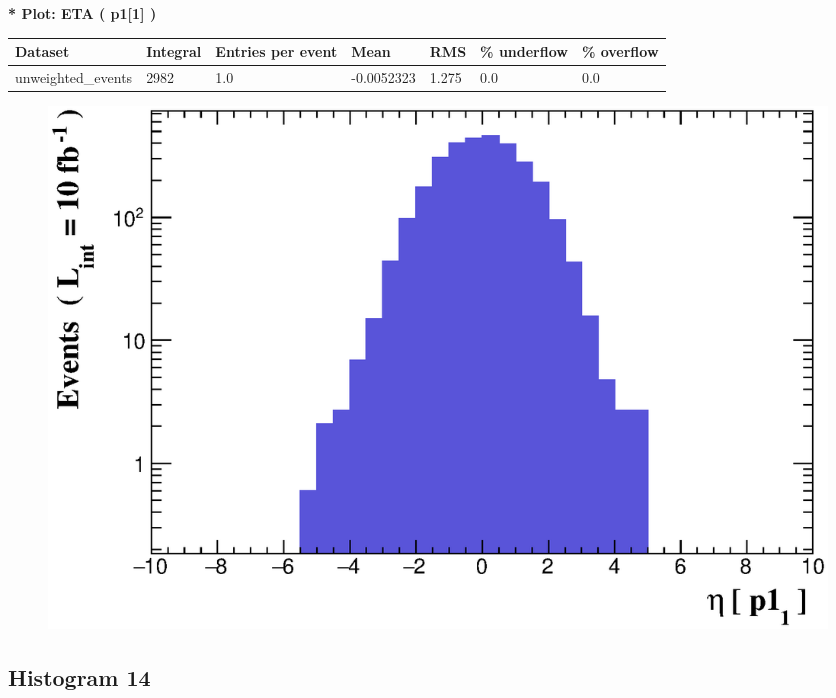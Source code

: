 \documentclass[a4paper, 10pt]{article}
\begin{document}
\textbf{* Plot: ETA ( p1[1] ) }\\
   \begin{table}[H]
  \begin{center}
    \begin{tabular}{|m{23.0mm}|m{23.0mm}|m{18.0mm}|m{19.0mm}|m{19.0mm}|m{19.0mm}|m{19.0mm}|}
      \hline
      {\cellcolor{yellow}         Dataset}& {\cellcolor{yellow}         Integral}& {\cellcolor{yellow}         Entries per event}& {\cellcolor{yellow}         Mean}& {\cellcolor{yellow}         RMS}& {\cellcolor{yellow}         \% underflow}& {\cellcolor{yellow}         \% overflow}\\
      \hline
      {\cellcolor{white}         unweighted\_events}& {\cellcolor{white}         2982}& {\cellcolor{white}         1.0}& {\cellcolor{white}         -0.0052323}& {\cellcolor{white}         1.275}& {\cellcolor{green}         0.0}& {\cellcolor{green}         0.0}\\
\hline
    \end{tabular}
  \end{center}
\end{table}

\begin{figure}[H]
  \begin{center}
    \includegraphics[scale=0.45]{selection_12.eps}\\
\caption{   }
  \end{center}
\end{figure}
      \newpage
\subsection{ Histogram 14}
\end{document}
